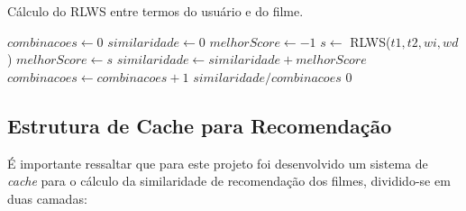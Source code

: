 \begin{algorithm}
	\caption{Cálculo do RLWS entre termos do usuário e do filme.}
	\begin{algorithmic}[1]
        	\State $combinacoes\gets 0$
        	\State $similaridade\gets 0$
        		\State $melhorScore\gets -1$
        			\State $s\gets$ RLWS($t1, t2, wi, wd$)
        				$melhorScore\gets s$
        			\EndIf
        		\EndFor
        			$similaridade\gets similaridade + melhorScore$
        			$combinacoes\gets combinacoes + 1$
        		\EndIf        		      	
        	\EndFor
				\Return $similaridade / combinacoes$
			\Else
				\Return $0$
			\EndIf
        \EndFunction
    \end{algorithmic}
\end{algorithm}

\label{ssec:cache}
\subsection{Estrutura de Cache para Recomendação}

É importante ressaltar que para este projeto foi desenvolvido um sistema de \textit{cache} para o cálculo da similaridade de recomendação dos filmes, dividido-se em duas camadas:

